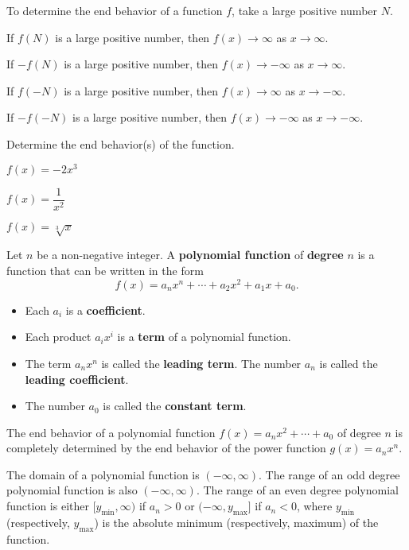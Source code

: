 \begin{howto}
  To determine the end behavior of a function $f$, take a large positive number $N$. 
  
  If $f(N)$ is a large positive number, then $f(x)\to \infty$ as $x\to \infty$. 
  
  If $-f(N)$ is a large positive number, then $f(x)\to -\infty$ as $x\to \infty$.
  
  If $f(-N)$ is a large positive number, then $f(x)\to\infty$ as $x\to -\infty$. 
  
  If $-f(-N)$ is a large positive number, then $f(x)\to-\infty$ as $x\to -\infty$.
\end{howto}

\begin{example}
  Determine the end behavior(s) of the function.\\
  \begin{enumerate*}
    \item $f(x)=-2x^3$
    \item $f(x)=\dfrac{1}{x^2}$
    \item $f(x)=\sqrt[3]{x}$\hfill\null
  \end{enumerate*}
\end{example}

\newpage

\begin{definition}
  Let $n$ be a non-negative integer. A \textbf{polynomial function} of \textbf{degree} $n$ is a function that can be written in the form 
  \[f(x)=a_nx^n + \cdots + a_2x^2 + a_1x + a_0.\]
\begin{itemize}
  \item Each \(a_i\) is a \textbf{coefficient}. 
  \item Each product \(a_ix^i\) is a \textbf{term} of a polynomial function.
  \item The term $a_nx^n$ is called the \textbf{leading term}. The number $a_n$ is called the \textbf{leading coefficient}.
  \item The number $a_0$ is called the \textbf{constant term}.
\end{itemize}
\end{definition}

\begin{note}
  The end behavior of a polynomial function $f(x)=a_nx^2+\cdots +a_0$ of degree $n$ is completely determined by the end behavior of the power function $g(x)=a_nx^n$.
  
  The domain of a polynomial function is $(-\infty, \infty)$. The range of an odd degree polynomial function is also $(-\infty, \infty)$. The range of an even degree polynomial function is either $[y_\text{min}, \infty)$ if $a_n>0$ or $(-\infty, y_\text{max}]$ if $a_n<0$, where $y_\text{min}$ (respectively, $y_\text{max}$) is the absolute minimum (respectively, maximum) of the function. 
\end{note}


